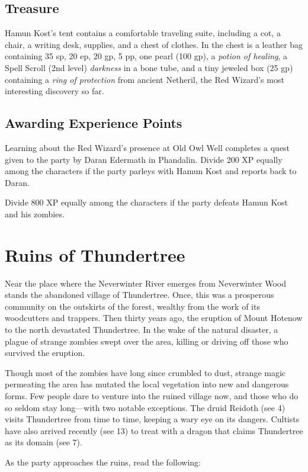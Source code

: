 \documentclass[10pt,a4paper,twoside,bg=print,twocolumn,openany,nodeprecatedcode]{dndbook}
\begin{document}
\subsection{Treasure}
Hamun Kost's tent contains a comfortable traveling suite, including a cot, a chair, a writing desk, supplies, and a chest of clothes. In the chest is a leather bag containing 35 sp, 20 ep, 20 gp, 5 pp, one pearl (100 gp), a \textit{potion of healing}, a Spell Scroll (2nd level) \textit{darkness} in a bone tube, and a tiny jeweled box (25 gp) containing a \textit{ring of protection} from ancient Netheril, the Red Wizard's most interesting discovery so far.

\subsection{Awarding Experience Points}
Learning about the Red Wizard's presence at Old Owl Well completes a quest given to the party by Daran Edermath in Phandalin. Divide 200 XP equally among the characters if the party parleys with Hamun Kost and reports back to Daran.

Divide 800 XP equally among the characters if the party defeats Hamun Kost and his zombies.

\section{Ruins of Thundertree}
Near the place where the Neverwinter River emerges from Neverwinter Wood stands the abandoned village of Thundertree. Once, this was a prosperous community on the outskirts of the forest, wealthy from the work of its woodcutters and trappers. Then thirty years ago, the eruption of Mount Hotenow to the north devastated Thundertree. In the wake of the natural disaster, a plague of strange zombies swept over the area, killing or driving off those who survived the eruption.

Though most of the zombies have long since crumbled to dust, strange magic permeating the area has mutated the local vegetation into new and dangerous forms. Few people dare to venture into the ruined village now, and those who do so seldom stay long—with two notable exceptions. The druid Reidoth (see 4) visits Thundertree from time to time, keeping a wary eye on its dangers. Cultists have also arrived recently (see 13) to treat with a dragon that claims Thundertree as its domain (see 7).

As the party approaches the ruins, read the following:
\end{document}
